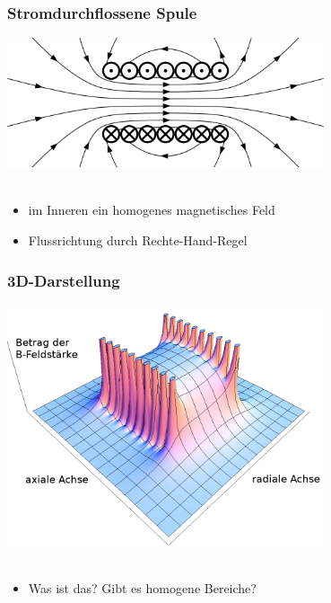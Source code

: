\begin{frame}
  \frametitle{Stromdurchflossene Spule}
  \begin{center}
    \includegraphics[width=0.7\textwidth,height=.6\textheight,keepaspectratio]{a08/H-Feld.png}\\
    {\tiny \hyperlink{refs}{\cite{wm}}} \\[1em]
    \begin{itemize}
      \item im Inneren ein homogenes magnetisches Feld
      \item Flussrichtung durch Rechte-Hand-Regel
    \end{itemize}
  \end{center}
\end{frame}

\begin{frame}
  \frametitle{3D-Darstellung}
  \begin{center}
    \includegraphics[width=0.7\textwidth,height=.6\textheight,keepaspectratio]{a08/3-D_HFeld.png}\\
    \tiny \hyperlink{refs}{\cite{wm}} \\[1em] \large
    \begin{itemize}
      \item Was ist das? Gibt es homogene Bereiche?
    \end{itemize}
  \end{center}
\end{frame}

